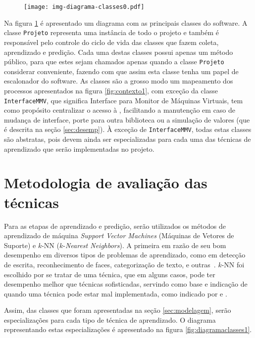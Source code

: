 
\begin{figure}[htp]
\centering
\texttt{[image: img-diagrama-classes0.pdf]}
\label{fig:diagramaclasses0}
\end{figure}

Na figura \ref{fig:diagramaclasses0} é apresentado um diagrama com as
principais classes do software. A classe \texttt{Projeto} representa uma
instância de todo o projeto e também é responsável pelo controle do ciclo
de vida das classes que fazem coleta, aprendizado e predição. Cada uma
destas classes possui apenas um método público, para que estes sejam
chamados apenas quando a classe \texttt{Projeto} considerar conveniente,
fazendo com que assim esta classe tenha um papel de escalonador do
software. As classes são a grosso modo um mapeamento dos processos
apresentados na figura \ref{fig:contexto1}, com exceção da classe
\texttt{InterfaceMMV}, que significa Interface para Monitor de
Máquinas Virtuais, tem como propósito centralizar o acesso à \libvirt{},
facilitando a manutenção em caso de mudança de interface, porte para outra
biblioteca ou a simulação de valores (que é descrita na seção
\ref{sec:desemp}). À exceção de \texttt{InterfaceMMV}, todas estas
classes são abstratas, pois devem ainda ser especializadas para cada uma
das técnicas de aprendizado que serão implementadas no projeto.


\section{Metodologia de avaliação das técnicas}

Para as etapas de aprendizado e predição, serão utilizados os métodos de
aprendizado de máquina \emph{Support Vector Machines} (Máquinas de Vetores
de Suporte) e $k$-NN ($k$-\emph{Nearest Neighbors}). A primeira em razão de seu
bom desempenho em diversos tipos de problemas de aprendizado, como em
detecção de escrita, reconhecimento de faces, categorização de texto, e
outras~\cite{bennett2000support}. $k$-NN foi escolhido por se tratar de uma
técnica, que em alguns casos, pode ter desempenho melhor que técnicas
sofisticadas, servindo como base e indicação de quando uma técnica pode
estar mal implementada, como indicado por  e
.

Assim, das classes que foram apresentadas na seção \ref{sec:modelagem},
serão especializações para cada tipo de técnica de aprendizado. O diagrama
representando estas especializações é apresentado na figura
\ref{fig:diagramaclasses1}.

